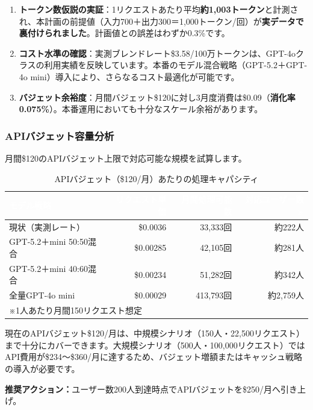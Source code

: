 \documentclass[a4paper,11pt]{ltjsarticle}
\begin{document}
\begin{infobox}
\begin{enumerate}
  \item \textbf{トークン数仮説の実証}：1リクエストあたり平均\textbf{約1,003トークン}と計測され、本計画の前提値（入力700＋出力300＝1,000トークン/回）が\textbf{実データで裏付けられました}。計画値との誤差はわずか0.3\%です。
  \item \textbf{コスト水準の確認}：実測ブレンドレート\$3.58/100万トークンは、GPT-4oクラスの利用実績を反映しています。本番のモデル混合戦略（GPT-5.2＋GPT-4o mini）導入により、さらなるコスト最適化が可能です。
  \item \textbf{バジェット余裕度}：月間バジェット\$120に対し3月度消費は\$0.09（\textbf{消化率0.075\%}）。本番運用においても十分なスケール余裕があります。
\end{enumerate}
\end{infobox}

\subsubsection{APIバジェット容量分析}

月間\$120のAPIバジェット上限で対応可能な規模を試算します。

\begin{table}[H]
\centering
\caption{APIバジェット（\$120/月）あたりの処理キャパシティ}
\begin{tabular}{lrrr}
\toprule
\rowcolor{headerblue}\textcolor{white}{\textbf{モデル戦略}} & \textcolor{white}{\textbf{リクエスト単価}} & \textcolor{white}{\textbf{月間処理可能数}} & \textcolor{white}{\textbf{対応ユーザー数※}} \\
\midrule
現状（実測レート） & \$0.0036 & 33,333回 & 約222人 \\
\rowcolor{lightgray}
GPT-5.2＋mini 50:50混合 & \$0.00285 & 42,105回 & 約281人 \\
GPT-5.2＋mini 40:60混合 & \$0.00234 & 51,282回 & 約342人 \\
\rowcolor{lightgray}
全量GPT-4o mini & \$0.00029 & 413,793回 & 約2,759人 \\
\bottomrule
\multicolumn{4}{l}{\small ※1人あたり月間150リクエスト想定} \\
\end{tabular}
\end{table}

\begin{warnbox}[バジェット超過のリスク閾値]
現在のAPIバジェット\$120/月は、中規模シナリオ（150人・22,500リクエスト）まで十分にカバーできます。大規模シナリオ（500人・100,000リクエスト）ではAPI費用が\$234〜\$360/月に達するため、バジェット増額またはキャッシュ戦略の導入が必要です。

\textbf{推奨アクション：}ユーザー数200人到達時点でAPIバジェットを\$250/月へ引き上げ。
\end{warnbox}
\end{document}
